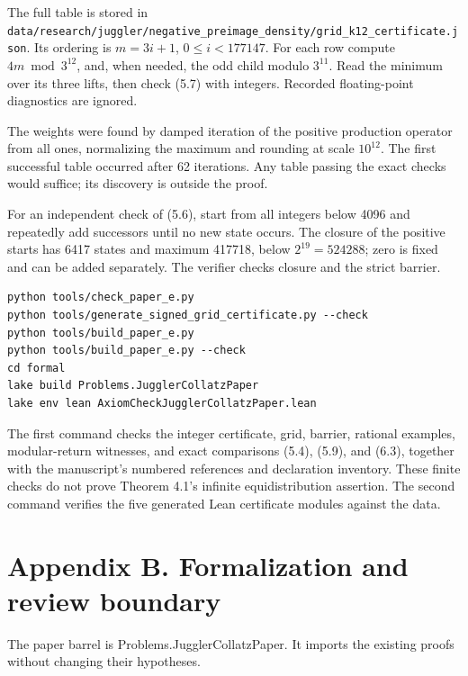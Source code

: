 \documentclass[11pt,a4paper]{article}
\begin{document}
The full table is stored in
\texttt{\nolinkurl{data/research/juggler/negative_preimage_density/grid_k12_certificate.json}}.
Its ordering is \(m=3i+1\), \(0\le i<177147\). For each row compute
\(4m\bmod3^{12}\), and, when needed, the odd child modulo \(3^{11}\).
Read the minimum over its three lifts, then check (5.7) with integers.
Recorded floating-point diagnostics are ignored.

The weights were found by damped iteration of the positive production
operator from all ones, normalizing the maximum and rounding at scale
\(10^{12}\). The first successful table occurred after 62 iterations.
Any table passing the exact checks would suffice; its discovery is
outside the proof.

For an independent check of (5.6), start from all integers below 4096
and repeatedly add successors until no new state occurs. The closure of
the positive starts has 6417 states and maximum 417718, below
\(2^{19}=524288\); zero is fixed and can be added separately. The
verifier checks closure and the strict barrier.

\begin{verbatim}
python tools/check_paper_e.py
python tools/generate_signed_grid_certificate.py --check
python tools/build_paper_e.py
python tools/build_paper_e.py --check
cd formal
lake build Problems.JugglerCollatzPaper
lake env lean AxiomCheckJugglerCollatzPaper.lean
\end{verbatim}

The first command checks the integer certificate, grid, barrier,
rational examples, modular-return witnesses, and exact comparisons
(5.4), (5.9), and (6.3), together with the manuscript's numbered
references and declaration inventory. These finite checks do not prove
Theorem 4.1's infinite equidistribution assertion. The second command
verifies the five generated Lean certificate modules against the data.

\clearpage

\section{Appendix B. Formalization and review
boundary}\label{appendix-b.-formalization-and-review-boundary}

The paper barrel is Problems.JugglerCollatzPaper. It imports the
existing proofs without changing their hypotheses.

\begingroup\small
\end{document}
